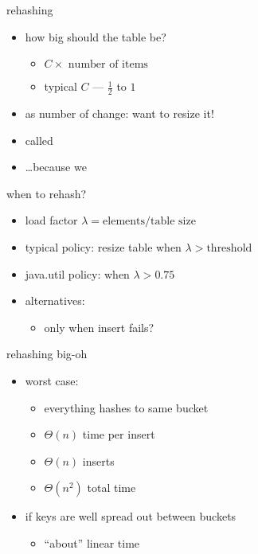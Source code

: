 \begin{frame}{rehashing}
\begin{itemize}
\item how big should the table be?
    \begin{itemize}
    \item $C \times \text{~number of items}$
    \item typical $C$ --- $\frac{1}{2}$ to $1$
    \end{itemize}
\vspace{.5cm}
\item<2-> as number of change: want to resize it!
\item<2-> called 
\item<2-> \ldots because we 
\end{itemize}
\end{frame}

\begin{frame}{when to rehash?}
\begin{itemize}
\item load factor $\lambda = \text{elements} / \text{table size}$
\item typical policy: resize table when $\lambda > \text{threshold}$
\item java.util policy: when $\lambda > 0.75$
\vspace{.5cm}
\item alternatives:
\begin{itemize}
    \item only when insert fails?
    \end{itemize}
\end{itemize}
\end{frame}

\begin{frame}{rehashing big-oh}
\begin{itemize}
\item worst case:
    \begin{itemize}
    \item everything hashes to same bucket
    \item $\Theta(n)$ time per insert
    \item $\Theta(n)$ inserts
    \item $\Theta(n^2)$ total time
    \end{itemize}
\item if keys are well spread out between buckets
    \begin{itemize}
    \item ``about'' linear time
    \end{itemize}
\end{itemize}
\end{frame}

